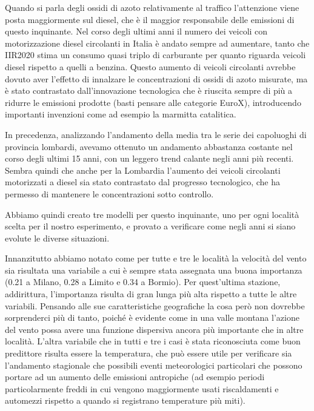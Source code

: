 Quando si parla degli ossidi di azoto relativamente al traffico l'attenzione viene posta maggiormente sul diesel, che è il maggior responsabile delle emissioni di questo inquinante. Nel corso degli ultimi anni il numero dei veicoli con motorizzazione diesel circolanti in Italia è andato sempre ad aumentare, tanto che IIR2020 \cite{iir2020} stima un consumo quasi triplo di carburante per quanto riguarda veicoli diesel rispetto a quelli a benzina. Questo aumento di veicoli circolanti avrebbe dovuto aver l'effetto di innalzare le concentrazioni di ossidi di azoto misurate, ma è stato contrastato dall'innovazione tecnologica che è riuscita sempre di più a ridurre le emissioni prodotte (basti pensare alle categorie EuroX), introducendo importanti invenzioni come ad esempio la marmitta catalitica.

In precedenza, analizzando  l'andamento della media tra le serie dei capoluoghi di provincia lombardi, avevamo ottenuto un andamento abbastanza costante nel corso degli ultimi 15 anni, con un leggero trend calante negli anni più recenti. Sembra quindi che anche per la Lombardia l'aumento dei veicoli circolanti motorizzati a diesel sia stato contrastato dal progresso tecnologico, che ha permesso di mantenere le concentrazioni sotto controllo.

Abbiamo quindi creato tre modelli per questo inquinante, uno per ogni località scelta per il nostro esperimento, e provato a verificare come negli anni si siano evolute le diverse situazioni.

Innanzitutto abbiamo notato come per tutte e tre le località la velocità del vento sia risultata una variabile a cui è sempre stata assegnata una buona importanza (0.21 a Milano, 0.28 a Limito e 0.34 a Bormio). Per quest'ultima stazione, addirittura, l'importanza risulta di gran lunga più alta rispetto a tutte le altre variabili.  Pensando alle sue caratteristiche geografiche la cosa però non dovrebbe sorprenderci più di tanto, poiché è evidente come in una valle montana l'azione del vento possa avere una funzione dispersiva ancora più importante che in altre località.
L'altra variabile che in tutti e tre i casi è stata riconosciuta come buon predittore risulta essere la temperatura, che può essere utile per verificare sia l'andamento stagionale che possibili eventi meteorologici particolari che possono portare ad un aumento delle emissioni antropiche (ad esempio periodi particolarmente freddi in cui vengono maggiormente usati riscaldamenti e automezzi rispetto a quando si registrano temperature più miti).  

